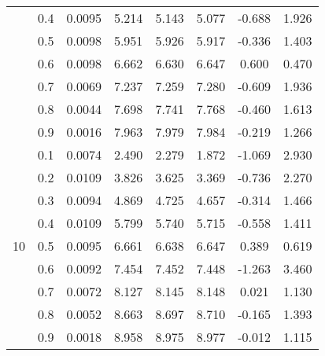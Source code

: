 \documentclass[11pt,a4paper]{report}
\begin{document}
\begin{longtable}{ | c | c || c | c | c | c | c | c | }
 & 0.4 & 0.0095 & 5.214 & 5.143 & 5.077 & -0.688 & 1.926 \\
 & 0.5 & 0.0098 & 5.951 & 5.926 & 5.917 & -0.336 & 1.403 \\
 & 0.6 & 0.0098 & 6.662 & 6.630 & 6.647 & 0.600 & 0.470 \\
 & 0.7 & 0.0069 & 7.237 & 7.259 & 7.280 & -0.609 & 1.936 \\
 & 0.8 & 0.0044 & 7.698 & 7.741 & 7.768 & -0.460 & 1.613 \\
 & 0.9 & 0.0016 & 7.963 & 7.979 & 7.984 & -0.219 & 1.266 \\
 \hline
\multirow{9}{*}{10} & 0.1 & 0.0074 & 2.490 & 2.279 & 1.872 & -1.069 & 2.930 \\
 & 0.2 & 0.0109 & 3.826 & 3.625 & 3.369 & -0.736 & 2.270 \\
 & 0.3 & 0.0094 & 4.869 & 4.725 & 4.657 & -0.314 & 1.466 \\
 & 0.4 & 0.0109 & 5.799 & 5.740 & 5.715 & -0.558 & 1.411 \\
 & 0.5 & 0.0095 & 6.661 & 6.638 & 6.647 & 0.389 & 0.619 \\
 & 0.6 & 0.0092 & 7.454 & 7.452 & 7.448 & -1.263 & 3.460 \\
 & 0.7 & 0.0072 & 8.127 & 8.145 & 8.148 & 0.021 & 1.130 \\
 & 0.8 & 0.0052 & 8.663 & 8.697 & 8.710 & -0.165 & 1.393 \\
 & 0.9 & 0.0018 & 8.958 & 8.975 & 8.977 & -0.012 & 1.115 \\
 \hline
\hline
\end{longtable}
\end{document}
